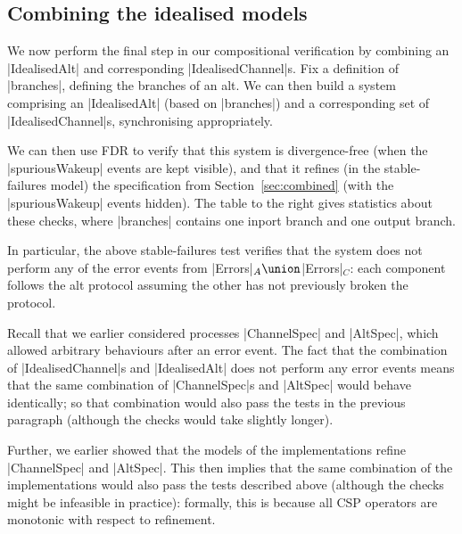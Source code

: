 \subsection{Combining the idealised models}

We now perform the final step in our compositional verification by combining
an |IdealisedAlt| and corresponding |IdealisedChannel|s.
%
Fix a definition of |branches|, defining the branches of an
alt.  We can then build a system comprising an |IdealisedAlt| (based on
|branches|) and a corresponding set of |IdealisedChannel|s, synchronising
appropriately.

\begin{window}
%
We can then use FDR to verify that this system is divergence-free (when the
|spuriousWakeup| events are kept visible), and that it refines (in the
stable-failures model) the specification from Section~\ref{sec:combined} (with
the |spuriousWakeup| events hidden).  The table to the right gives statistics about these checks, where
|branches| contains one inport branch and one output branch.
\end{window}

In particular, the above stable-failures test verifies that the system does
not perform any of the error events from |Errors|$_A \union\null$|Errors|$_C$:
each component follows the alt protocol assuming the other has not previously
broken the protocol.

Recall that we earlier considered processes |ChannelSpec| and |AltSpec|, which
allowed arbitrary behaviours after an error event.  The fact that the
combination of |IdealisedChannel|s and |IdealisedAlt| does not perform any
error events means that the same combination of |ChannelSpec|s and |AltSpec|
would behave identically; so that combination would also pass the tests in the
previous paragraph (although the checks would take slightly longer).

Further, we earlier showed that the models of the implementations refine
|ChannelSpec| and |AltSpec|.  This then implies that the same combination of
the implementations would also pass the tests described above (although the
checks might be infeasible in practice): formally, this is because all CSP
operators are monotonic with respect to refinement.

